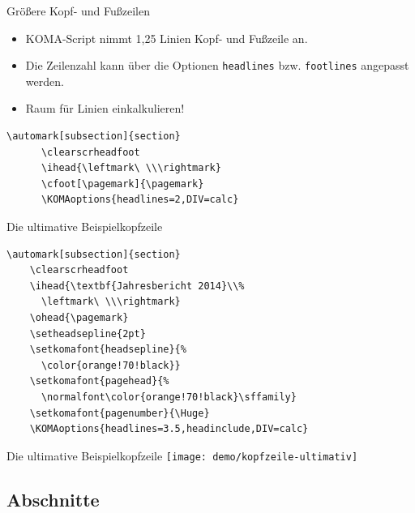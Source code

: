 \begin{Frame}[fragile]{Größere Kopf- und Fußzeilen}
  \begin{itemize}
    \item KOMA-Script nimmt 1,25 Linien Kopf- und Fußzeile an.
    \item Die Zeilenzahl kann über die Optionen \lstinline-headlines-
      bzw. \lstinline-footlines- angepasst werden.
    \item Raum für Linien einkalkulieren!
  \end{itemize}

  \xxx

  \begin{Beispiel}
    \begin{lstlisting}[gobble=6,style=block]
      \automark[subsection]{section}
      \clearscrheadfoot
      \ihead{\leftmark\ \\\rightmark}
      \cfoot[\pagemark]{\pagemark}
      \KOMAoptions{headlines=2,DIV=calc}
    \end{lstlisting}
  \end{Beispiel}
\end{Frame}

\begin{Frame}[fragile]{Die ultimative Beispielkopfzeile}
  \begin{lstlisting}[gobble=4]
    \automark[subsection]{section}
    \clearscrheadfoot
    \ihead{\textbf{Jahresbericht 2014}\\%
      \leftmark\ \\\rightmark}
    \ohead{\pagemark}
    \setheadsepline{2pt}
    \setkomafont{headsepline}{%
      \color{orange!70!black}}
    \setkomafont{pagehead}{%
      \normalfont\color{orange!70!black}\sffamily}
    \setkomafont{pagenumber}{\Huge}
    \KOMAoptions{headlines=3.5,headinclude,DIV=calc}
  \end{lstlisting}
\end{Frame}

\begin{Frame}{Die ultimative Beispielkopfzeile}
  \texttt{[image: demo/kopfzeile-ultimativ]}
\end{Frame}

\subsection{Abschnitte}

